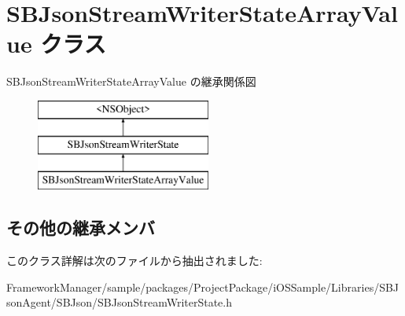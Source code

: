 \hypertarget{interface_s_b_json_stream_writer_state_array_value}{}\section{S\+B\+Json\+Stream\+Writer\+State\+Array\+Value クラス}
\label{interface_s_b_json_stream_writer_state_array_value}
S\+B\+Json\+Stream\+Writer\+State\+Array\+Value の継承関係図\begin{figure}[H]
\begin{center}
\leavevmode
\includegraphics[height=3.000000cm]{interface_s_b_json_stream_writer_state_array_value}
\end{center}
\end{figure}
\subsection*{その他の継承メンバ}


このクラス詳解は次のファイルから抽出されました\+:\begin{DoxyCompactItemize}
\item 
Framework\+Manager/sample/packages/\+Project\+Package/i\+O\+S\+Sample/\+Libraries/\+S\+B\+Json\+Agent/\+S\+B\+Json/S\+B\+Json\+Stream\+Writer\+State.\+h\end{DoxyCompactItemize}
